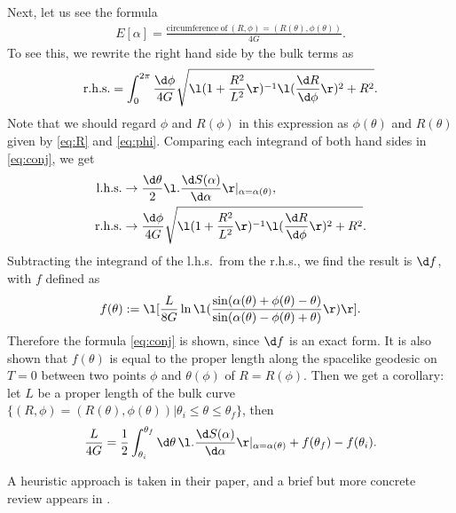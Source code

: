 \documentclass[12pt]{article}
\begin{document}
Next, let us see the formula
\begin{align}
	E[\alpha] = \frac{\mathrm{circumference~of~}(R,\phi) = (R(\theta),\phi(\theta))}{4G}.\label{eq:conj}
\end{align}
To see this, we rewrite the right hand side by the bulk terms as
\begin{align}
	\mathrm{r.h.s.} = \int_0^{2\pi} \frac{\d\phi}{4G}\sqrt{\l(1 + \frac{R^2}{L^2}\r)^{-1}\l(\frac{\d R}{\d \phi}\r)^2 + R^2}.
\end{align}
Note that we should regard $\phi$ and $R(\phi)$ in this expression as $\phi(\theta)$ and $R(\theta)$ given by \eqref{eq:R} 
and \eqref{eq:phi}.
Comparing each integrand of both hand sides in \eqref{eq:conj}, we get
\begin{align}
	\mathrm{l.h.s.} &\rightarrow \frac{\d\theta}{2}\l.\frac{\d S(\alpha)}{\d\alpha}\r|_{\alpha = \alpha(\theta)},\\
	\mathrm{r.h.s.} &\rightarrow \frac{\d\phi}{4G}\sqrt{\l(1 + \frac{R^2}{L^2}\r)^{-1}\l(\frac{\d R}{\d \phi}\r)^2 + R^2}.
\end{align}
Subtracting the integrand of the l.h.s.\ from the r.h.s., we find the result is $\d f$, with $f$ defined as
\begin{align}
	f(\theta) := \l[\frac{L}{8G}\ln\l(\frac{\sin(\alpha(\theta)+\phi(\theta)-\theta)}{\sin(\alpha(\theta)-\phi(\theta) + \theta)} \r) \r].
\end{align}
Therefore the formula \eqref{eq:conj} is shown, since $\d f$ is an exact form.
It is also shown that $f(\theta)$ is equal to the proper length along the spacelike geodesic on $T=0$ between two points $\phi$ and $\theta(\phi)$ of $R = R(\phi)$.
Then we get a corollary: let $L$ be a proper length of the bulk curve $\{(R,\phi) = (R(\theta),\phi(\theta))|\theta_i\le\theta\le \theta_f\}$, then
\begin{align}
	\frac{L}{4G} = \frac{1}{2}\int_{\theta_i}^{\theta_f}\d\theta\,\l.\frac{\d S(\alpha)}{\d \alpha}\r|_{\alpha = \alpha(\theta)}  + f(\theta_f) - f(\theta_i).
\end{align}

A heuristic approach is taken in their paper, and a brief but more concrete review appears in \cite{Czech:2014ppa}.


































 

\end{document}
